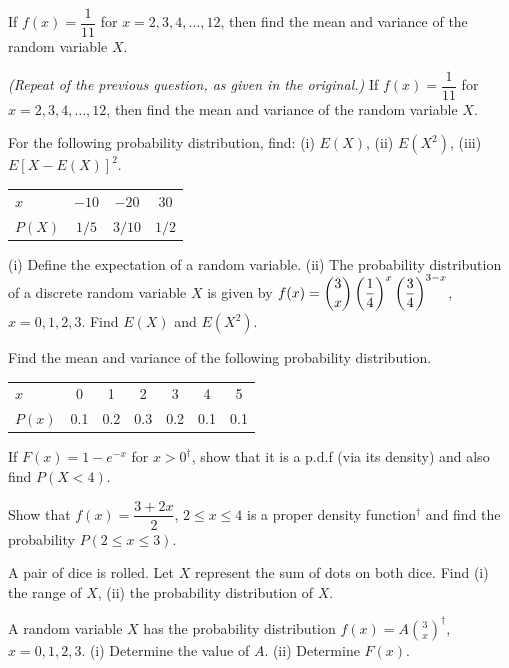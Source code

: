\documentclass[11pt,a4paper]{article}
\begin{document}
\begin{longlist}
\item If $f(x)=\dfrac{1}{11}$ for $x=2,3,4,\ldots,12$, then find the mean and variance of the random variable $X$.

\item \emph{(Repeat of the previous question, as given in the original.)} If $f(x)=\dfrac{1}{11}$ for $x=2,3,4,\ldots,12$, then find the mean and variance of the random variable $X$.

\item For the following probability distribution, find: (i) $E(X)$, (ii) $E(X^2)$, (iii) $E[X-E(X)]^2$.
\begin{center}
\begin{tabular}{l ccc}
\toprule
$x$ & $-10$ & $-20$ & 30 \\
$P(X)$ & $1/5$ & $3/10$ & $1/2$ \\
\bottomrule
\end{tabular}
\end{center}

\item (i) Define the expectation of a random variable. (ii) The probability distribution of a discrete random variable $X$ is given by $f(x)=\dbinom{3}{x}\left(\dfrac{1}{4}\right)^x\left(\dfrac{3}{4}\right)^{3-x}$, $x=0,1,2,3$. Find $E(X)$ and $E(X^2)$.

\item Find the mean and variance of the following probability distribution.
\begin{center}
\begin{tabular}{l cccccc}
\toprule
$x$ & 0 & 1 & 2 & 3 & 4 & 5 \\
$P(x)$ & 0.1 & 0.2 & 0.3 & 0.2 & 0.1 & 0.1 \\
\bottomrule
\end{tabular}
\end{center}

\item If $F(x)=1-e^{-x}$ for $x>0^\dagger$, show that it is a p.d.f (via its density) and also find $P(X<4)$.

\item Show that $f(x)=\dfrac{3+2x}{2}$, $2\leq x\leq 4$ is a proper density function$^\dagger$ and find the probability $P(2\leq x\leq 3)$.

\item A pair of dice is rolled. Let $X$ represent the sum of dots on both dice. Find (i) the range of $X$, (ii) the probability distribution of $X$.

\item A random variable $X$ has the probability distribution $f(x)=A\binom{3}{x}^\dagger$, $x=0,1,2,3$. (i) Determine the value of $A$. (ii) Determine $F(x)$.


\end{longlist}
\end{document}
